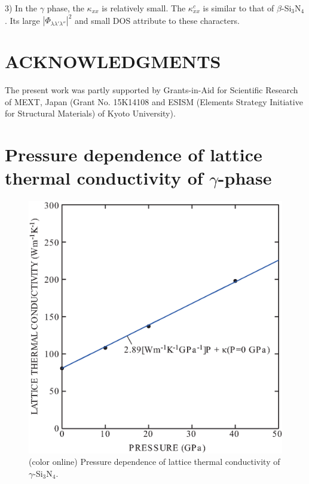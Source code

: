 \documentclass[twocolumn,amsmath,amssymb,a4paper,prb,superscriptaddress,floatfix]{revtex4-1}
\begin{document}
3) In the $\gamma$ phase, the $\kappa_{xx}$ is relatively small. The
$\kappa^c_{xx}$ is similar to that of $\beta$-Si$_3$N$_4$. Its large
$|\Phi_{\lambda\lambda'\lambda''}|^2$
and small DOS attribute to these characters.

\section*{ACKNOWLEDGMENTS}
The present work was partly supported by Grants-in-Aid for Scientific
Research of MEXT, Japan (Grant No. 15K14108 and ESISM (Elements Strategy
Initiative for Structural Materials) of Kyoto University).

\appendix
\section{Pressure dependence of lattice thermal conductivity of $\gamma$-phase}
\begin{figure}[ht]
 \begin{center}
  \includegraphics[width=0.80\linewidth]{S1.eps} \caption{(color online)
  Pressure dependence of lattice thermal conductivity of $\gamma$-Si$_3$N$_4$.  \label{fig:S1} }
 \end{center}
\end{figure}

\end{document}
